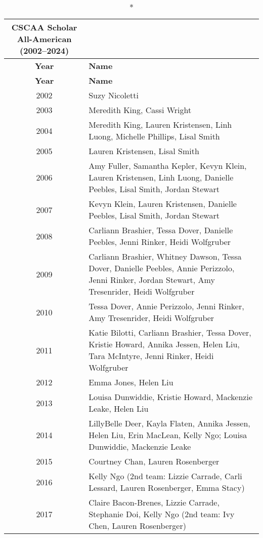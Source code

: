 \clearpage
\begin{longtable}{c p{}}
\caption*{\textbf{\textcolor{teamprimary}{CSCAA Scholar All-American (2002--2024)}}} \\
\toprule
\rowcolor{teamprimary!25}
\textbf{Year} & \textbf{Name} \\
\midrule
\endfirsthead

\toprule
\rowcolor{teamprimary!25}
\textbf{Year} & \textbf{Name} \\
\midrule
\endhead

\bottomrule
\endfoot

2002 & Suzy Nicoletti \\
2003 & Meredith King, Cassi Wright \\
2004 & Meredith King, Lauren Kristensen, Linh Luong, Michelle Phillips, Lisal Smith \\
2005 & Lauren Kristensen, Lisal Smith \\
2006 & Amy Fuller, Samantha Kepler, Kevyn Klein, Lauren Kristensen, Linh Luong, Danielle Peebles, Lisal Smith, Jordan Stewart \\
2007 & Kevyn Klein, Lauren Kristensen, Danielle Peebles, Lisal Smith, Jordan Stewart \\
2008 & Carliann Brashier, Tessa Dover, Danielle Peebles, Jenni Rinker, Heidi Wolfgruber \\
2009 & Carliann Brashier, Whitney Dawson, Tessa Dover, Danielle Peebles, Annie Perizzolo, Jenni Rinker, Jordan Stewart, Amy Tresenrider, Heidi Wolfgruber \\
2010 & Tessa Dover, Annie Perizzolo, Jenni Rinker, Amy Tresenrider, Heidi Wolfgruber \\
2011 & Katie Bilotti, Carliann Brashier, Tessa Dover, Kristie Howard, Annika Jessen, Helen Liu, Tara McIntyre, Jenni Rinker, Heidi Wolfgruber \\
2012 & Emma Jones, Helen Liu \\
2013 & Louisa Dunwiddie, Kristie Howard, Mackenzie Leake, Helen Liu \\
2014 & LillyBelle Deer, Kayla Flaten, Annika Jessen, Helen Liu, Erin MacLean, Kelly Ngo; Louisa Dunwiddie, Mackenzie Leake \\
2015 & Courtney Chan, Lauren Rosenberger \\
2016 & Kelly Ngo (2nd team: Lizzie Carrade, Carli Lessard, Lauren Rosenberger, Emma Stacy) \\
2017 & Claire Bacon-Brenes, Lizzie Carrade, Stephanie Doi, Kelly Ngo (2nd team: Ivy Chen, Lauren Rosenberger) \\

\end{longtable}
